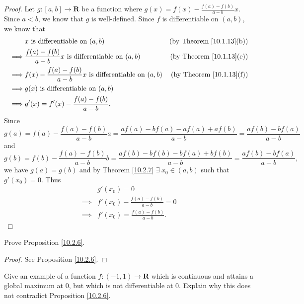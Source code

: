 \begin{proof}
    Let \(g : [a, b] \to \mathbf{R}\) be a function where \(g(x) = f(x) - \frac{f(a) - f(b)}{a - b} x\).
    Since \(a < b\), we know that \(g\) is well-defined.
    Since \(f\) is differentiable on \((a, b)\), we know that
    \begin{align*}
                 & x \text{ is differentiable on } (a, b)                                  & \text{(by Theorem \ref{10.1.13}(b))} \\
        \implies & \frac{f(a) - f(b)}{a - b} x \text{ is differentiable on } (a, b)        & \text{(by Theorem \ref{10.1.13}(e))} \\
        \implies & f(x) - \frac{f(a) - f(b)}{a - b} x \text{ is differentiable on } (a, b) & \text{(by Theorem \ref{10.1.13}(f))} \\
        \implies & g(x) \text{ is differentiable on } (a, b)                                                                      \\
        \implies & g'(x) = f'(x) - \frac{f(a) - f(b)}{a - b}.
    \end{align*}
    Since
    \[
        g(a) = f(a) - \frac{f(a) - f(b)}{a - b} a = \frac{af(a) - bf(a) - af(a) + af(b)}{a - b} = \frac{af(b) - bf(a)}{a - b}
    \]
    and
    \[
        g(b) = f(b) - \frac{f(a) - f(b)}{a - b} b = \frac{af(b) - bf(b) - bf(a) + bf(b)}{a - b} = \frac{af(b) - bf(a)}{a - b},
    \]
    we have \(g(a) = g(b)\) and by Theorem \ref{10.2.7} \(\exists\ x_0 \in (a, b)\) such that \(g'(x_0) = 0\).
    Thus
    \begin{align*}
                 & g'(x_0) = 0                             \\
        \implies & f'(x_0) - \frac{f(a) - f(b)}{a - b} = 0 \\
        \implies & f'(x_0) = \frac{f(a) - f(b)}{a - b}.
    \end{align*}
\end{proof}

\exercisesection

\begin{exercise}\label{ex 10.2.1}
    Prove Proposition \ref{10.2.6}.
\end{exercise}

\begin{proof}
    See Proposition \ref{10.2.6}.
\end{proof}

\begin{exercise}\label{ex 10.2.2}
    Give an example of a function \(f : (-1, 1) \to \mathbf{R}\) which is continuous and attains a global maximum at \(0\), but which is not differentiable at \(0\).
    Explain why this does not contradict Proposition \ref{10.2.6}.
\end{exercise}

